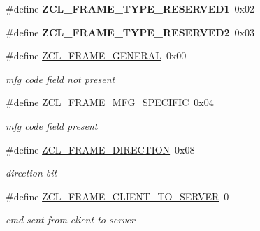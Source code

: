 \begin{DoxyCompactItemize}
\mbox{\label{group__zcl_ga8b924ad81837f99ce23adb416f888cba}} 
\#define {\bfseries Z\+C\+L\+\_\+\+F\+R\+A\+M\+E\+\_\+\+T\+Y\+P\+E\+\_\+\+R\+E\+S\+E\+R\+V\+E\+D1}~0x02
\item 
\mbox{\label{group__zcl_gadd2b5e079220ed32284b8e188d34d613}} 
\#define {\bfseries Z\+C\+L\+\_\+\+F\+R\+A\+M\+E\+\_\+\+T\+Y\+P\+E\+\_\+\+R\+E\+S\+E\+R\+V\+E\+D2}~0x03
\item 
\mbox{\label{group__zcl_ga09fb05e268f791031acb037c9b5df555}} 
\#define \hyperlink{group__zcl_ga09fb05e268f791031acb037c9b5df555}{Z\+C\+L\+\_\+\+F\+R\+A\+M\+E\+\_\+\+G\+E\+N\+E\+R\+AL}~0x00
\begin{DoxyCompactList}\small\item\em mfg code field not present \end{DoxyCompactList}\item 
\mbox{\label{group__zcl_ga48ffbdfe840975527d8e9e6d86c12dae}} 
\#define \hyperlink{group__zcl_ga48ffbdfe840975527d8e9e6d86c12dae}{Z\+C\+L\+\_\+\+F\+R\+A\+M\+E\+\_\+\+M\+F\+G\+\_\+\+S\+P\+E\+C\+I\+F\+IC}~0x04
\begin{DoxyCompactList}\small\item\em mfg code field present \end{DoxyCompactList}\item 
\mbox{\label{group__zcl_ga38975849d925ebb3643cb9f5d62b68fe}} 
\#define \hyperlink{group__zcl_ga38975849d925ebb3643cb9f5d62b68fe}{Z\+C\+L\+\_\+\+F\+R\+A\+M\+E\+\_\+\+D\+I\+R\+E\+C\+T\+I\+ON}~0x08
\begin{DoxyCompactList}\small\item\em direction bit \end{DoxyCompactList}\item 
\mbox{\label{group__zcl_ga245f966df7431d5b9268bbf227770173}} 
\#define \hyperlink{group__zcl_ga245f966df7431d5b9268bbf227770173}{Z\+C\+L\+\_\+\+F\+R\+A\+M\+E\+\_\+\+C\+L\+I\+E\+N\+T\+\_\+\+T\+O\+\_\+\+S\+E\+R\+V\+ER}~0
\begin{DoxyCompactList}\small\item\em cmd sent from client to server \end{DoxyCompactList}\item 
\mbox{\label{group__zcl_gac173779e7c48817dbd79042d7a189524}} 

\end{DoxyCompactItemize}

